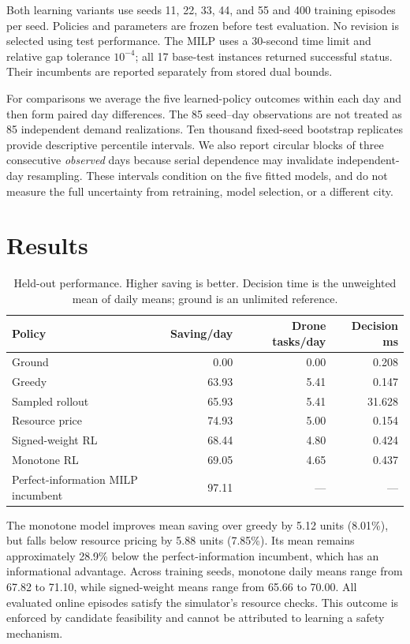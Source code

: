 \documentclass[11pt,a4paper]{article}
\begin{document}
Both learning variants use seeds 11, 22, 33, 44, and 55 and 400 training episodes per seed. Policies and parameters are frozen before test evaluation. No revision is selected using test performance. The MILP uses a 30-second time limit and relative gap tolerance $10^{-4}$; all 17 base-test instances returned successful status. Their incumbents are reported separately from stored dual bounds.

For comparisons we average the five learned-policy outcomes within each day and then form paired day differences. The 85 seed--day observations are not treated as 85 independent demand realizations. Ten thousand fixed-seed bootstrap replicates provide descriptive percentile intervals. We also report circular blocks of three consecutive \emph{observed} days because serial dependence may invalidate independent-day resampling. These intervals condition on the five fitted models, and do not measure the full uncertainty from retraining, model selection, or a different city.

\section{Results}

\begin{table}[ht]
\centering\caption{Held-out performance. Higher saving is better. Decision time is the unweighted mean of daily means; ground is an unlimited reference.}
\begin{tabular}{lrrr}\toprule
Policy & Saving/day & Drone tasks/day & Decision ms\\\midrule
Ground&0.00&0.00&0.208\\
Greedy&63.93&5.41&0.147\\
Sampled rollout&65.93&5.41&31.628\\
Resource price&74.93&5.00&0.154\\
Signed-weight RL&68.44&4.80&0.424\\
Monotone RL&69.05&4.65&0.437\\
Perfect-information MILP incumbent&97.11&---&---\\\bottomrule
\end{tabular}
\end{table}

The monotone model improves mean saving over greedy by 5.12 units (8.01\%), but falls below resource pricing by 5.88 units (7.85\%). Its mean remains approximately 28.9\% below the perfect-information incumbent, which has an informational advantage. Across training seeds, monotone daily means range from 67.82 to 71.10, while signed-weight means range from 65.66 to 70.00. All evaluated online episodes satisfy the simulator's resource checks. This outcome is enforced by candidate feasibility and cannot be attributed to learning a safety mechanism.
\end{document}
